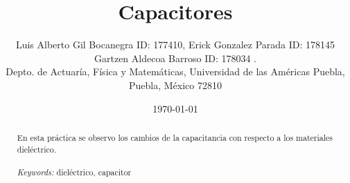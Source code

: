 \documentclass{article}
\begin{document}

\renewcommand{\footrulewidth}{1pt}
\renewcommand{\tablename}{Tabla}
\renewcommand{\figurename}{Figura}


\title{Capacitores}
\author{\small{Luis Alberto Gil Bocanegra ID: 177410, Erick Gonzalez Parada ID: 178145}\\
 \small{Gartzen Aldecoa Barroso ID: 178034 .}\\		%
	   \small{Depto. de Actuaría, Física y Matemáticas, Universidad de las Américas Puebla, Puebla, M\'exico 72810}}
\date{\small{\today}}

\maketitle


\begin{abstract}
	En esta práctica se observo los cambios de la capacitancia con respecto a los materiales 
	dieléctrico.
\\
\\
{\it Keywords:}  dieléctrico, capacitor 
\\
\\
\end{abstract}

\end{document}
